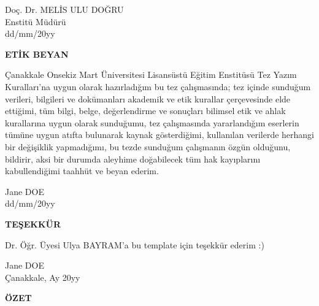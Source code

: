 \documentclass[12pt]{report}
\begin{document}
\vspace{1.5cm}

\begin{flushright}
\begin{minipage}{6cm}
\centering
Doç. Dr. MELİS ULU DOĞRU \\
Enstitü Müdürü \\[0.7cm]
dd/mm/20yy
\end{minipage}
\end{flushright}


\newpage
\centerline{\normalsize\bfseries ETİK BEYAN}
\vspace{\baselineskip}


Çanakkale Onsekiz Mart Üniversitesi Lisansüstü Eğitim Enstitüsü Tez Yazım Kuralları’na uygun olarak hazırladığım bu tez çalışmasında; tez içinde sunduğum verileri, bilgileri ve dokümanları akademik ve etik kurallar çerçevesinde elde ettiğimi, tüm bilgi, belge, değerlendirme ve sonuçları bilimsel etik ve ahlak kurallarına uygun olarak sunduğumu, tez çalışmasında yararlandığım eserlerin tümüne uygun atıfta bulunarak kaynak gösterdiğimi, kullanılan verilerde herhangi bir değişiklik yapmadığımı, bu tezde sunduğum çalışmanın özgün olduğunu, bildirir, aksi bir durumda aleyhime doğabilecek tüm hak kayıplarını kabullendiğimi taahhüt ve beyan ederim.

\vspace{5cm}

\begin{flushright}
Jane DOE\\
dd/mm/20yy
\end{flushright}


\newpage
\centerline{\normalsize\bfseries TEŞEKKÜR}
\vspace{\baselineskip}

Dr. Öğr. Üyesi Ulya BAYRAM'a bu template için teşekkür ederim :) 
\lipsum[1-2]

\vspace{\baselineskip}

\begin{flushright}
Jane DOE\\
Çanakkale, Ay 20yy
\end{flushright}
\vfill

\newpage
{}
\centerline{\normalsize\bfseries ÖZET}
\end{document}
